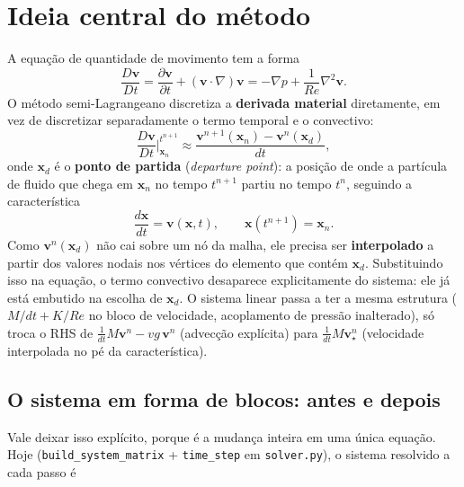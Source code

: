 \documentclass[11pt,a4paper]{article}
\begin{document}
\section{Ideia central do método}

A equação de quantidade de movimento tem a forma
\[
\frac{D\mathbf{v}}{Dt} = \frac{\partial \mathbf{v}}{\partial t} +
(\mathbf{v}\cdot\nabla)\mathbf{v} = -\nabla p + \frac{1}{Re}\nabla^2
\mathbf{v}.
\]
O método semi-Lagrangeano discretiza a \textbf{derivada material}
diretamente, em vez de discretizar separadamente o termo temporal e o
convectivo:
\[
\frac{D\mathbf{v}}{Dt}\bigg|_{\mathbf{x}_n}^{t^{n+1}} \approx
\frac{\mathbf{v}^{n+1}(\mathbf{x}_n) -
\mathbf{v}^{n}(\mathbf{x}_d)}{dt},
\]
onde $\mathbf{x}_d$ é o \textbf{ponto de partida} (\emph{departure
point}): a posição de onde a partícula de fluido que chega em
$\mathbf{x}_n$ no tempo $t^{n+1}$ partiu no tempo $t^n$, seguindo a
característica
\[
\frac{d\mathbf{x}}{dt} = \mathbf{v}(\mathbf{x}, t), \qquad
\mathbf{x}(t^{n+1}) = \mathbf{x}_n.
\]
Como $\mathbf{v}^n(\mathbf{x}_d)$ não cai sobre um nó da malha, ele
precisa ser \textbf{interpolado} a partir dos valores nodais nos
vértices do elemento que contém $\mathbf{x}_d$. Substituindo isso na
equação, o termo convectivo desaparece explicitamente do sistema: ele
já está embutido na escolha de $\mathbf{x}_d$. O sistema linear passa
a ter a mesma estrutura ($M/dt + K/Re$ no bloco de velocidade,
acoplamento de pressão inalterado), só troca o RHS de $\frac{1}{dt}
M\mathbf{v}^n - vg\,\mathbf{v}^n$ (advecção explícita) para
$\frac{1}{dt} M\mathbf{v}^n_\star$ (velocidade interpolada no pé da
característica).

\subsection{O sistema em forma de blocos: antes e depois}

Vale deixar isso explícito, porque é a mudança inteira em uma única
equação. Hoje (\texttt{build\_system\_matrix} + \texttt{time\_step}
em \texttt{solver.py}), o sistema resolvido a cada passo é
\end{document}
